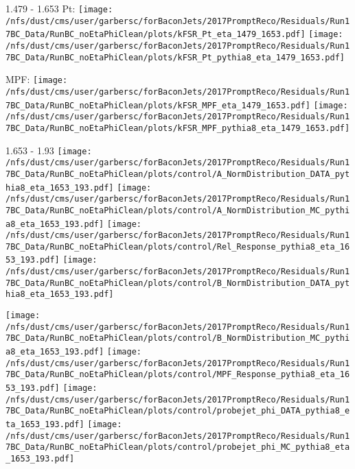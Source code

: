 \documentclass[t,compress]{beamer}
\begin{document}
\begin{frame}{1.479 - 1.653}
	 Pt: \texttt{[image: /nfs/dust/cms/user/garbersc/forBaconJets/2017PromptReco/Residuals/Run17BC\_Data/RunBC\_noEtaPhiClean/plots/kFSR\_Pt\_eta\_1479\_1653.pdf]}
	\texttt{[image: /nfs/dust/cms/user/garbersc/forBaconJets/2017PromptReco/Residuals/Run17BC\_Data/RunBC\_noEtaPhiClean/plots/kFSR\_Pt\_pythia8\_eta\_1479\_1653.pdf]}
\newline

	 MPF: \texttt{[image: /nfs/dust/cms/user/garbersc/forBaconJets/2017PromptReco/Residuals/Run17BC\_Data/RunBC\_noEtaPhiClean/plots/kFSR\_MPF\_eta\_1479\_1653.pdf]}
	\texttt{[image: /nfs/dust/cms/user/garbersc/forBaconJets/2017PromptReco/Residuals/Run17BC\_Data/RunBC\_noEtaPhiClean/plots/kFSR\_MPF\_pythia8\_eta\_1479\_1653.pdf]}
\end{frame}

\begin{frame}{1.653 - 1.93}
	\texttt{[image: /nfs/dust/cms/user/garbersc/forBaconJets/2017PromptReco/Residuals/Run17BC\_Data/RunBC\_noEtaPhiClean/plots/control/A\_NormDistribution\_DATA\_pythia8\_eta\_1653\_193.pdf]}
	\texttt{[image: /nfs/dust/cms/user/garbersc/forBaconJets/2017PromptReco/Residuals/Run17BC\_Data/RunBC\_noEtaPhiClean/plots/control/A\_NormDistribution\_MC\_pythia8\_eta\_1653\_193.pdf]}
	\texttt{[image: /nfs/dust/cms/user/garbersc/forBaconJets/2017PromptReco/Residuals/Run17BC\_Data/RunBC\_noEtaPhiClean/plots/control/Rel\_Response\_pythia8\_eta\_1653\_193.pdf]}
	\texttt{[image: /nfs/dust/cms/user/garbersc/forBaconJets/2017PromptReco/Residuals/Run17BC\_Data/RunBC\_noEtaPhiClean/plots/control/B\_NormDistribution\_DATA\_pythia8\_eta\_1653\_193.pdf]}
\newline

	\texttt{[image: /nfs/dust/cms/user/garbersc/forBaconJets/2017PromptReco/Residuals/Run17BC\_Data/RunBC\_noEtaPhiClean/plots/control/B\_NormDistribution\_MC\_pythia8\_eta\_1653\_193.pdf]}
	\texttt{[image: /nfs/dust/cms/user/garbersc/forBaconJets/2017PromptReco/Residuals/Run17BC\_Data/RunBC\_noEtaPhiClean/plots/control/MPF\_Response\_pythia8\_eta\_1653\_193.pdf]}
	\texttt{[image: /nfs/dust/cms/user/garbersc/forBaconJets/2017PromptReco/Residuals/Run17BC\_Data/RunBC\_noEtaPhiClean/plots/control/probejet\_phi\_DATA\_pythia8\_eta\_1653\_193.pdf]}
	\texttt{[image: /nfs/dust/cms/user/garbersc/forBaconJets/2017PromptReco/Residuals/Run17BC\_Data/RunBC\_noEtaPhiClean/plots/control/probejet\_phi\_MC\_pythia8\_eta\_1653\_193.pdf]}
\end{frame}
\end{document}
